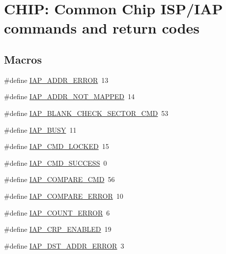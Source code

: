 \hypertarget{group__COMMON__IAP}{}\section{C\+H\+IP\+: Common Chip I\+S\+P/\+I\+AP commands and return codes}
\label{group__COMMON__IAP}
\subsection*{Macros}
\begin{DoxyCompactItemize}
\item 
\#define \hyperlink{group__COMMON__IAP_gaaff51c256373e4a20f8dab1adc1300f3}{I\+A\+P\+\_\+\+A\+D\+D\+R\+\_\+\+E\+R\+R\+OR}~13
\item 
\#define \hyperlink{group__COMMON__IAP_ga4cfd7e0c133c450664f0a60bfbbd9eaa}{I\+A\+P\+\_\+\+A\+D\+D\+R\+\_\+\+N\+O\+T\+\_\+\+M\+A\+P\+P\+ED}~14
\item 
\#define \hyperlink{group__COMMON__IAP_ga2117bbba83cf2110a3fde4cafe189784}{I\+A\+P\+\_\+\+B\+L\+A\+N\+K\+\_\+\+C\+H\+E\+C\+K\+\_\+\+S\+E\+C\+T\+O\+R\+\_\+\+C\+MD}~53
\item 
\#define \hyperlink{group__COMMON__IAP_gaa4e308bc310bb68aa8409a6f830aee04}{I\+A\+P\+\_\+\+B\+U\+SY}~11
\item 
\#define \hyperlink{group__COMMON__IAP_gafdceac1acd5c460094011136c08574a4}{I\+A\+P\+\_\+\+C\+M\+D\+\_\+\+L\+O\+C\+K\+ED}~15
\item 
\#define \hyperlink{group__COMMON__IAP_ga6855b3bb97689d746eff1f27dde58fc5}{I\+A\+P\+\_\+\+C\+M\+D\+\_\+\+S\+U\+C\+C\+E\+SS}~0
\item 
\#define \hyperlink{group__COMMON__IAP_gaa63a66d010441cd1b5837742455cf075}{I\+A\+P\+\_\+\+C\+O\+M\+P\+A\+R\+E\+\_\+\+C\+MD}~56
\item 
\#define \hyperlink{group__COMMON__IAP_gabeb57ce3d4009fdee1847f5494376c8d}{I\+A\+P\+\_\+\+C\+O\+M\+P\+A\+R\+E\+\_\+\+E\+R\+R\+OR}~10
\item 
\#define \hyperlink{group__COMMON__IAP_ga719488ff2abf2f325b73a10b20403813}{I\+A\+P\+\_\+\+C\+O\+U\+N\+T\+\_\+\+E\+R\+R\+OR}~6
\item 
\#define \hyperlink{group__COMMON__IAP_gaaccc191ce402e19b0c0ae399f614efe8}{I\+A\+P\+\_\+\+C\+R\+P\+\_\+\+E\+N\+A\+B\+L\+ED}~19
\item 
\#define \hyperlink{group__COMMON__IAP_ga72a13c4c7132aa3da476fc0907cb2a08}{I\+A\+P\+\_\+\+D\+S\+T\+\_\+\+A\+D\+D\+R\+\_\+\+E\+R\+R\+OR}~3

\end{DoxyCompactItemize}
